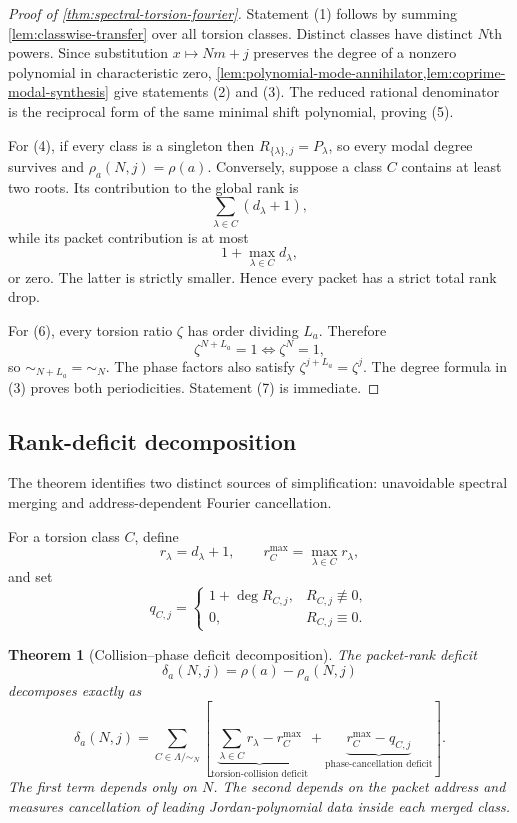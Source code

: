 \documentclass[11pt]{article}
\newtheorem{theorem}{Theorem}[section]\newtheorem{proposition}[theorem]{Proposition}\newtheorem{lemma}[theorem]{Lemma}\newtheorem{corollary}[theorem]{Corollary}
\theoremstyle{definition}\newtheorem{definition}[theorem]{Definition}\newtheorem{example}[theorem]{Example}\newtheorem{construction}[theorem]{Construction}\newtheorem{algorithm}[theorem]{Algorithm}\newtheorem{conjecture}[theorem]{Conjecture}\newtheorem{problem}[theorem]{Problem}
\theoremstyle{remark}\newtheorem{remark}[theorem]{Remark}\newtheorem{boundary}[theorem]{Boundary}\newtheorem{certificate}[theorem]{Computational Certificate}\newtheorem{classical}[theorem]{Classical Input}\newtheorem{principle}[theorem]{Structural Principle}
\begin{document}
\begin{proof}[Proof of \cref{thm:spectral-torsion-fourier}]
Statement (1) follows by summing \cref{lem:classwise-transfer} over all torsion classes.  Distinct classes have distinct $N$th powers.  Since substitution $x\mapsto Nm+j$ preserves the degree of a nonzero polynomial in characteristic zero, \cref{lem:polynomial-mode-annihilator,lem:coprime-modal-synthesis} give statements (2) and (3).  The reduced rational denominator is the reciprocal form of the same minimal shift polynomial, proving (5).

For (4), if every class is a singleton then $R_{\{\lambda\},j}=P_\lambda$, so every modal degree survives and $\rho_a(N,j)=\rho(a)$.  Conversely, suppose a class $C$ contains at least two roots.  Its contribution to the global rank is
\[
 \sum_{\lambda\in C}(d_\lambda+1),
\]
while its packet contribution is at most
\[
 1+\max_{\lambda\in C}d_\lambda,
\]
or zero.  The latter is strictly smaller.  Hence every packet has a strict total rank drop.

For (6), every torsion ratio $\zeta$ has order dividing $L_a$.  Therefore
\[
 \zeta^{N+L_a}=1\Longleftrightarrow\zeta^N=1,
\]
so $\sim_{N+L_a}=\sim_N$.  The phase factors also satisfy $\zeta^{j+L_a}=\zeta^j$.  The degree formula in (3) proves both periodicities.  Statement (7) is immediate.
\end{proof}

\subsection{Rank-deficit decomposition}
The theorem identifies two distinct sources of simplification: unavoidable spectral merging and address-dependent Fourier cancellation.

For a torsion class $C$, define
\[
 r_\lambda=d_\lambda+1,
 \qquad
 r_C^{\max}=\max_{\lambda\in C}r_\lambda,
\]
and set
\[
 q_{C,j}=
 \begin{cases}
 1+\deg R_{C,j},&R_{C,j}\not\equiv0,\\
 0,&R_{C,j}\equiv0.
 \end{cases}
\]

\begin{theorem}[Collision--phase deficit decomposition]
\label{thm:deficit-decomposition}
The packet-rank deficit
\[
 \delta_a(N,j)=\rho(a)-\rho_a(N,j)
\]
decomposes exactly as
\[
 \boxed{
 \delta_a(N,j)
 =
 \sum_{C\in\Lambda/{\sim_N}}
 \left[
 \underbrace{\sum_{\lambda\in C}r_\lambda-r_C^{\max}}_{\text{torsion-collision deficit}}
 +
 \underbrace{r_C^{\max}-q_{C,j}}_{\text{phase-cancellation deficit}}
 \right].
 }
\]
The first term depends only on $N$.  The second depends on the packet address and measures cancellation of leading Jordan-polynomial data inside each merged class.
\end{theorem}
\end{document}
